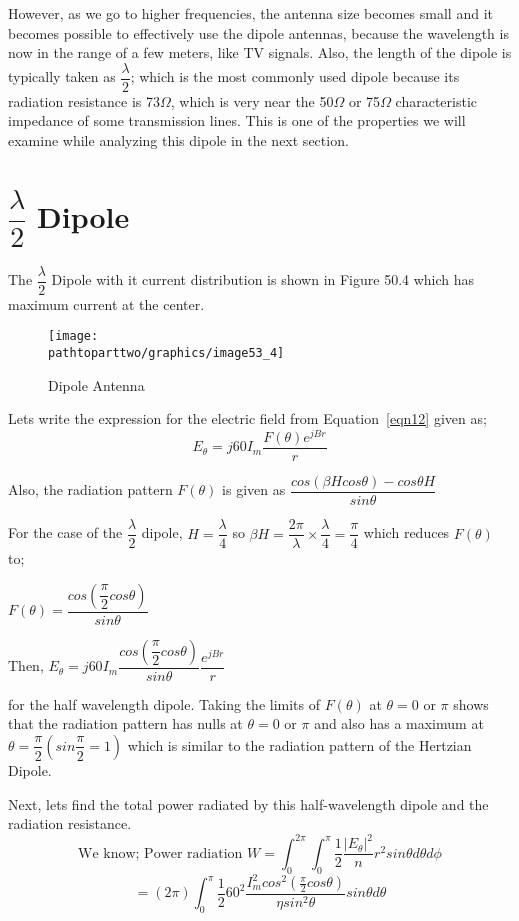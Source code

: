 However, as we go to higher frequencies, the antenna size becomes small and it becomes possible to effectively use the dipole antennas, because the wavelength is now in the range of a few meters, like TV signals. Also, the length of the dipole is typically taken as $\dfrac{\lambda}{2}$; which is the most commonly used dipole because its radiation resistance is 73$\Omega$, which is very near the 50$\Omega$ or 75$\Omega$ characteristic impedance of some transmission lines. This is one of the properties we will examine while analyzing this dipole in the next section.
\section{$\dfrac{\lambda}{2}$ Dipole}
The $\dfrac{\lambda}{2}$ Dipole with it current distribution is shown in Figure 50.4 which has maximum current at the center.
\begin{figure}[h]
\centering
\texttt{[image: \\pathtoparttwo/graphics/image53\_4]}
\caption{Dipole Antenna}
\label{fig:fig4}
\end{figure}
Lets write the expression for the electric field from Equation~\ref{eqn12} given as; 
\begin{equation*}
E_\theta = j60I_m \frac{F(\theta)e^{jBr}}{r}
\end{equation*}
\begin{center}
Also, the radiation pattern $F(\theta)$ is given as $\dfrac{cos(\beta H cos\theta) - cos\theta H}{sin \theta}$

For the case of the $\dfrac{\lambda}{2}$ dipole, $H = \dfrac{\lambda}{4}$ so $\beta H = \dfrac{2\pi}{\lambda} \times \dfrac{\lambda}{4}= \dfrac{\pi}{4} $ which reduces $F(\theta)$ to;

$F(\theta) = \dfrac{cos (\dfrac{\pi}{2} cos\theta)}{sin\theta}$

Then, $E_\theta = j60I_m \dfrac{cos (\dfrac{\pi}{2} cos\theta)}{sin\theta} \dfrac{e^{jBr}}{r}$ 
\end{center}for the half wavelength dipole.
Taking the limits of $F(\theta)$ at $\theta = 0$ or $\pi$ shows that the radiation pattern has nulls at $\theta = 0 \text{ or } \pi$ and also has a maximum at $\theta = \dfrac{\pi}{2} (sin \dfrac{\pi}{2} = 1)$ which is similar to the radiation pattern of the Hertzian Dipole.

Next, lets find the total power radiated by this half-wavelength dipole and the radiation resistance. 
\[ \text{We know; Power radiation } W = \int_0^{2\pi}\int_{0}^{\pi} \frac{1}{2}\frac{|E_\theta|^2}{n}r^2sin\theta d\theta d\phi \]
\[ = (2\pi)\int_{0}^{\pi} \frac{1}{2} 60^2 \frac{I_m^2cos^2(\frac{\pi}{2}cos\theta)}{\eta sin^2\theta}sin\theta d\theta \]

